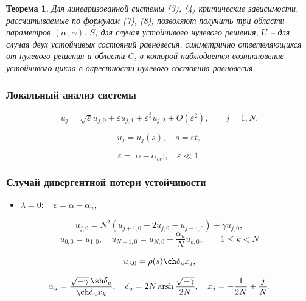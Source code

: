 \documentclass[fullscreen=true, unicode, bookmarks=false]{beamer}
\newtheorem{rustheorem}{Теорема }
\DeclareMathOperator{\arsh}{arsh}
\begin{document}
\begin{frame}

\begin{rustheorem}
Для линеаризованной системы (3), (4) критические зависимости, рассчитываемые по формулам (7), (8), позволяют получить три области параметров $ (\alpha,\: \gamma) $: $ S $, для случая устойчивого нулевого решения, $ U $ -- для случая двух устойчивых состояний равновесия, симметрично ответвляющихся от нулевого решения и области $ C $, в которой наблюдается возникновение устойчивого цикла в окрестности нулевого состояния равновесия.
\end{rustheorem}

\end{frame}

\begin{frame}
\frametitle{ Локальный анализ системы }

\begin{equation}
	u_j = \sqrt{\varepsilon}u_{j,0} + \varepsilon u_{j,1} + \varepsilon^{\frac{3}{2}} u_{j,2} + O(\varepsilon^2), \qquad j = \overline{1, N}.
\end{equation}

\bigskip

$$ u_j = u_j(s), \quad s = \varepsilon t, $$

$$ \varepsilon = | \alpha - \alpha_{cr} |, \quad \varepsilon \ll 1.  $$

\end{frame}

\begin{frame}
\frametitle{ Случай дивергентной потери устойчивости }

\begin{itemize}
\item { $ \lambda = 0: \quad \varepsilon=\alpha-\alpha_u, $
}
\end{itemize}

\bigskip
\pause

\begin{equation}
	\dot u_{j,0} = N^2(u_{j+1,0} - 2u_{j,0} + u_{j-1,0}) + \gamma u_{j,0},
\end{equation}
\begin{equation}
	u_{0,0} = u_{1,0}, \quad u_{N+1,0} = u_{N,0} + \dfrac{\alpha_u}{N}u_{k,0}, \qquad 1 \le k < N
\end{equation}

\bigskip

$$ u_{j,0} = \rho(s) \ch \delta_u x_j, $$

\bigskip

$$ \alpha_u = \frac{ \sqrt{-\gamma} \, \sh \delta_u }{ \ch\delta_u x_k }, \quad \delta_u = 2N \arsh \dfrac{\sqrt{-\gamma}}{2N}, \quad x_j = -\dfrac{1}{2N} + \dfrac{j}{N}. $$

\end{frame}
\end{document}

